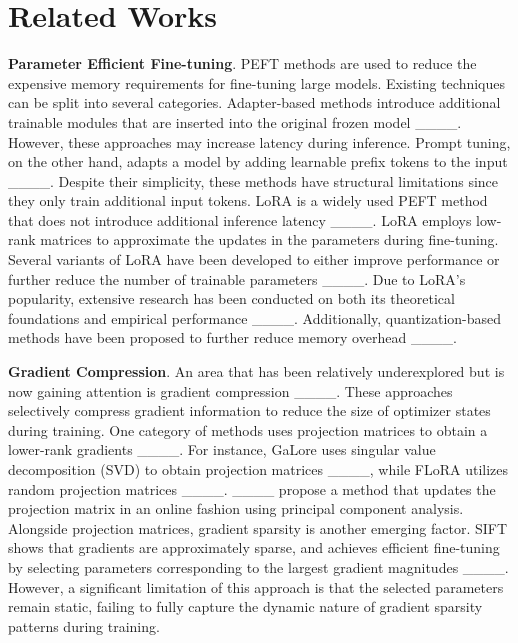 \section{Related Works}
\textbf{Parameter Efficient Fine-tuning}. PEFT methods are used to reduce the expensive memory requirements for fine-tuning large models. Existing techniques can be split into several categories. Adapter-based methods introduce additional trainable modules that are inserted into the original frozen model ____. However, these approaches may increase latency during inference. Prompt tuning, on the other hand, adapts a model by adding learnable prefix tokens to the input ____. Despite their simplicity, these methods have structural limitations since they only train additional input tokens. LoRA is a widely used PEFT method that does not introduce additional inference latency ____. LoRA employs low-rank matrices to approximate the updates in the parameters during fine-tuning. Several variants of LoRA have been developed to either improve performance or further reduce the number of trainable parameters ____. Due to LoRA's popularity, extensive research has been conducted on both its theoretical foundations and empirical performance ____. Additionally, quantization-based methods have been proposed to further reduce memory overhead ____. 

\textbf{Gradient Compression}. An area that has been relatively underexplored but is now gaining attention is gradient compression ____. These approaches selectively compress gradient information to reduce the size of optimizer states during training. One category of methods uses projection matrices to obtain a lower-rank gradients ____. For instance, GaLore uses singular value decomposition (SVD) to obtain projection matrices ____, while FLoRA utilizes random projection matrices ____. ____ propose a method that updates the projection matrix in an online fashion using principal component analysis. Alongside projection matrices, gradient sparsity is another emerging factor. SIFT shows that gradients are approximately sparse, and achieves efficient fine-tuning by selecting parameters corresponding to the largest gradient magnitudes ____. However, a significant limitation of this approach is that the selected parameters remain static, failing to fully capture the dynamic nature of gradient sparsity patterns during training.